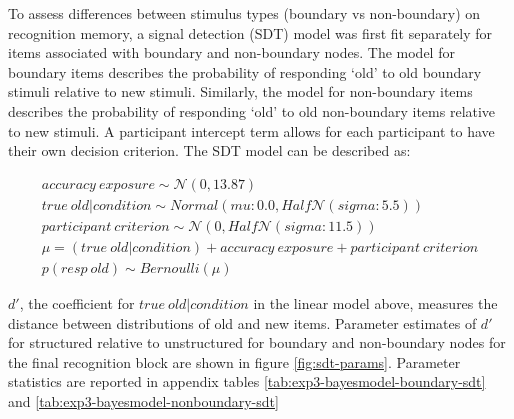 To assess differences between stimulus types (boundary vs non-boundary) on recognition memory, a signal detection (SDT) model was first fit separately for items associated with boundary and non-boundary nodes. The model for boundary items describes the probability of responding `old' to old boundary stimuli relative to new stimuli. Similarly, the model for non-boundary items describes the probability of responding `old' to old non-boundary items relative to new stimuli. A participant intercept term allows for each participant to have their own decision criterion.  The SDT model can be described as: 

\begin{equation}
    \begin{aligned}
        accuracy\ exposure \sim \mathcal{N}(0, 13.87) \\
        true\ old | condition \sim Normal(mu: 0.0, Half\mathcal{N}(sigma: 5.5)) \\ 
        participant\ criterion \sim \mathcal{N}(0, Half\mathcal{N}(sigma: 11.5)) \\
        \mu = (true\ old | condition) + accuracy\ exposure + participant\ criterion \\ 
        p(resp\ old) \sim Bernoulli(\mu)        
    \end{aligned}
\end{equation}




$d'$, the coefficient for $true\ old | condition$ in the linear model above, measures the distance between distributions of old and new items. Parameter estimates of $d'$ for structured relative to unstructured for boundary and non-boundary nodes for the final recognition block are shown in figure \ref{fig:sdt-params}. Parameter statistics are reported in appendix tables \ref{tab:exp3-bayesmodel-boundary-sdt} and \ref{tab:exp3-bayesmodel-nonboundary-sdt}

